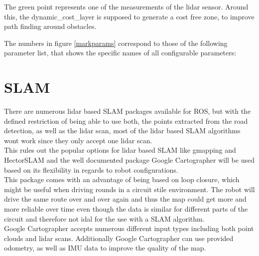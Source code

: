 The green point represents one of the measurements of the lidar sensor. Around this, the dynamic\_cost\_layer is supposed to generate a cost free zone, to improve path finding around obstacles.

The numbers in figure \ref{markparams} correspond to those of the following parameter list, that shows the specific names of all configurable parameters:

\begin{table}[H]
\centering
{}
\caption{MarkeFreeSpace parameters}
\label{markfreespaceparams}
\end{table}












\section{SLAM}
There are numerous lidar based SLAM packages available for ROS, but with the defined restriction of being able to use both, the points extracted from the road detection, as well as the lidar scan, most of the lidar based SLAM algorithms wont work since they only accept one lidar scan.\\
This rules out the popular options for lidar based SLAM like gmapping and HectorSLAM and the well documented package Google Cartographer will be used based on its flexibility in regards to robot configurations.\\
This package comes with an advantage of being based on loop closure, which might be useful when driving rounds in a circuit stile environment. The robot will drive the same route over and over again and thus the map could get more and more reliable over time even though the data is similar for different parts of the circuit and therefore not idal for the use with a SLAM algorithm.\\

Google Cartographer accepts numerous different input types including both point clouds and lidar scans. Additionally Google Cartographer can use provided odometry, as well as IMU data to improve the quality of the map.\\








